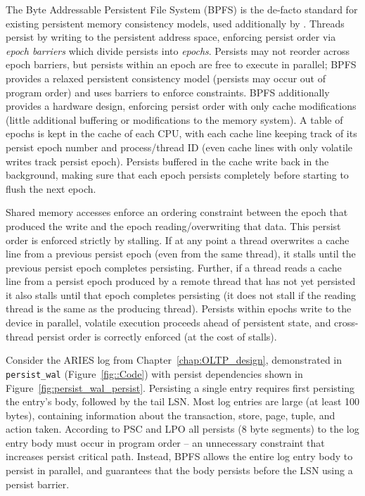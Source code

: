 The Byte Addressable Persistent File System (BPFS) \cite{ConditNightingale09} is the de-facto standard for existing persistent memory consistency models, used additionally by \cite{CoburnCaulfield11, FangHsiao11, VenkataramanTolia11}.
Threads persist by writing to the persistent address space, enforcing persist order via \emph{epoch barriers} which divide persists into \emph{epochs}.
Persists may not reorder across epoch barriers, but persists within an epoch are free to execute in parallel; BPFS provides a relaxed persistent consistency model (persists may occur out of program order) and uses barriers to enforce constraints.
BPFS additionally provides a hardware design, enforcing persist order with only cache modifications (little additional buffering or modifications to the memory system).
A table of epochs is kept in the cache of each CPU, with each cache line keeping track of its persist epoch number and process/thread ID (even cache lines with only volatile writes track persist epoch).
Persists buffered in the cache write back in the background, making sure that each epoch persists completely before starting to flush the next epoch.

Shared memory accesses enforce an ordering constraint between the epoch that produced the write and the epoch reading/overwriting that data.
This persist order is enforced strictly by stalling.
If at any point a thread overwrites a cache line from a previous persist epoch (even from the same thread), it stalls until the previous persist epoch completes persisting.
Further, if a thread reads a cache line from a persist epoch produced by a remote thread that has not yet persisted it also stalls until that epoch completes persisting (it does not stall if the reading thread is the same as the producing thread).
Persists within epochs write to the device in parallel, volatile execution proceeds ahead of persistent state, and cross-thread persist order is correctly enforced (at the cost of stalls).



Consider the ARIES log from Chapter~\ref{chap:OLTP_design}, demonstrated in \texttt{persist\_wal} (Figure~\ref{fig::Code}) with persist dependencies shown in Figure~\ref{fig:persist_wal_persist}.
Persisting a single entry requires first persisting the entry's body, followed by the tail LSN.
Most log entries are large (at least 100 bytes), containing information about the transaction, store, page, tuple, and action taken.
According to PSC and LPO all persists (8 byte segments) to the log entry body must occur in program order -- an unnecessary constraint that increases persist critical path.
Instead, BPFS allows the entire log entry body to persist in parallel, and guarantees that the body persists before the LSN using a persist barrier.

